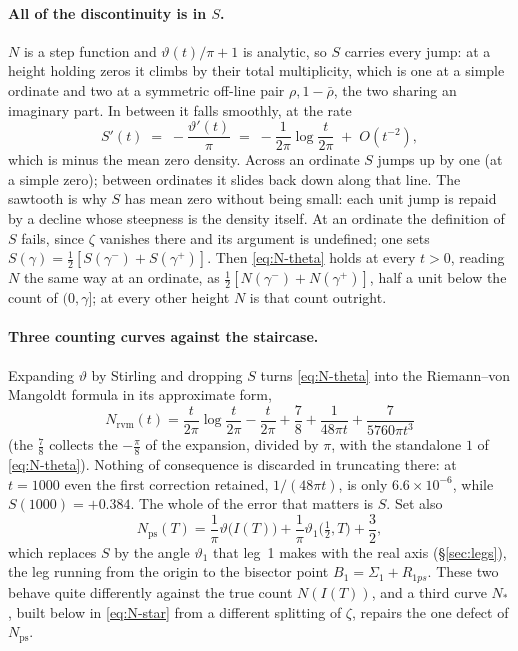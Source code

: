 \documentclass[11pt]{article}
\theoremstyle{definition}
\begin{document}
\paragraph{All of the discontinuity is in $S$.} $N$ is a step function and
$\vartheta(t)/\pi+1$ is analytic, so $S$ carries every jump: at a height
holding zeros it climbs by their total multiplicity, which is one at a simple
ordinate and two at a symmetric off-line pair $\rho,1-\bar\rho$, the two
sharing an imaginary part. In between it falls smoothly, at the rate
\begin{equation}\label{eq:S-slope}
S'(t) \;=\; -\frac{\vartheta'(t)}{\pi} \;=\; -\frac{1}{2\pi}\log\frac{t}{2\pi}
\;+\;O(t^{-2}),
\end{equation}
which is minus the mean zero density. Across an ordinate $S$ jumps up by one (at a
simple zero);
between ordinates it slides back down along that line. The sawtooth is why $S$ has mean zero without being small: each unit jump is
repaid by a decline whose steepness is the density itself. At an ordinate the
definition of $S$ fails, since $\zeta$ vanishes there and its argument is
undefined; one sets $S(\gamma)=\tfrac12[S(\gamma^{-})+S(\gamma^{+})]$. Then
\eqref{eq:N-theta} holds at every $t>0$, reading $N$ the same way at an
ordinate, as $\tfrac12[N(\gamma^{-})+N(\gamma^{+})]$, half a unit below the
count of $(0,\gamma]$; at every other height $N$ is that count outright.

\paragraph{Three counting curves against the staircase.} Expanding $\vartheta$ by
Stirling and dropping $S$ turns \eqref{eq:N-theta} into the Riemann--von
Mangoldt formula in its approximate form,
\begin{equation}\label{eq:N-rvm}
N_{\mathrm{rvm}}(t)
=\frac{t}{2\pi}\log\frac{t}{2\pi}-\frac{t}{2\pi}+\frac78
+\frac{1}{48\pi t}+\frac{7}{5760\pi t^{3}}
\end{equation}
(the $\tfrac78$ collects the $-\tfrac\pi8$ of the expansion, divided by $\pi$,
with the standalone $1$ of \eqref{eq:N-theta}). Nothing of consequence is
discarded in truncating there: at $t=1000$ even the first correction retained,
$1/(48\pi t)$, is only $6.6\times10^{-6}$, while $S(1000)=+0.384$. The whole of
the error that matters is $S$. Set also
\begin{equation}\label{eq:N-ps}
N_{\mathrm{ps}}(T)
=\frac{1}{\pi}\vartheta\bigl(I(T)\bigr)
+\frac{1}{\pi}\vartheta_1\bigl(\tfrac12,T\bigr)+\frac32 ,
\end{equation}
which replaces $S$ by the angle $\vartheta_1$ that leg~1 makes with the real
axis (\S\ref{sec:legs}), the leg running from the origin to the bisector point
$B_1=\Sigma_1+R_{1ps}$. These two behave quite differently against the true
count $N(I(T))$, and a third curve $N_{\ast}$, built below in
\eqref{eq:N-star} from a different splitting of $\zeta$, repairs the one defect
of $N_{\mathrm{ps}}$.
\end{document}
